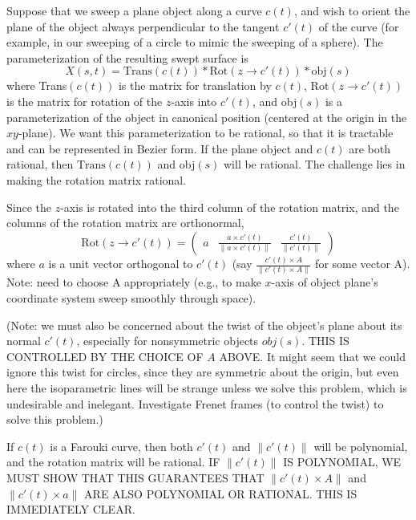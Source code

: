 \begin{rmk}
Suppose that we sweep a plane object along a curve $c(t)$,
and wish to orient the plane of the object always perpendicular
to the tangent $c'(t)$ of the curve (for example, in our sweeping of a
circle to mimic the sweeping of a sphere).
The parameterization of the resulting swept surface is
\[ X(s,t) = \mbox{Trans}(c(t)) * \mbox{Rot}(z \rightarrow c'(t)) * \mbox{obj}(s)
\]
where Trans$(c(t))$ is the matrix for translation by $c(t)$,
Rot$(z \rightarrow c'(t))$ is the matrix for rotation of the $z$-axis
into $c'(t)$, and obj$(s)$ is a parameterization of the object 
in canonical position (centered at the origin in the $xy$-plane).
We want this parameterization to be rational, so that it is tractable
and can be represented in Bezier form.
If the plane object and $c(t)$ are both rational, then 
$\mbox{Trans}(c(t))$ and obj$(s)$ will be rational.
The challenge lies in making the rotation matrix rational.

Since the $z$-axis is rotated into the third column of the rotation matrix,
and the columns of the rotation matrix are orthonormal,
\begin{equation}
\label{eq:rot}
\mbox{Rot}(z \rightarrow c'(t)) = 
\left( \begin{array}{ccc} a & \frac{a \times c'(t)}{\|a \times c'(t)\|}
			    & \frac{c'(t)}{\|c'(t)\|} \end{array} \right)
\end{equation}
where $a$ is a unit vector orthogonal to $c'(t)$ (say 
$\frac{c'(t) \times A}{\|c'(t) \times A\|}$ for some vector A).
Note: need to choose A appropriately (e.g., to make $x$-axis of object 
plane's coordinate system sweep smoothly through space).

(Note: we must also be concerned about the twist of the object's plane
about its normal $c'(t)$, especially for nonsymmetric objects $obj(s)$.
THIS IS CONTROLLED BY THE CHOICE OF $A$ ABOVE.
It might seem that we could ignore this twist for circles, since
they are symmetric about the origin, but even here the isoparametric
lines will be strange unless we solve this problem, which is undesirable
and inelegant.  Investigate Frenet frames (to control the twist) to
solve this problem.)

If $c(t)$ is a Farouki curve,
then both $c'(t)$ and $\| c'(t) \|$ will be polynomial,
and the rotation matrix will be rational.
IF $\|c'(t)\|$ IS POLYNOMIAL, WE MUST SHOW THAT THIS GUARANTEES
THAT $\|c'(t) \times A\|$ and $\|c'(t) \times a\|$ ARE ALSO POLYNOMIAL
OR RATIONAL.  THIS IS IMMEDIATELY CLEAR.


\end{rmk}
